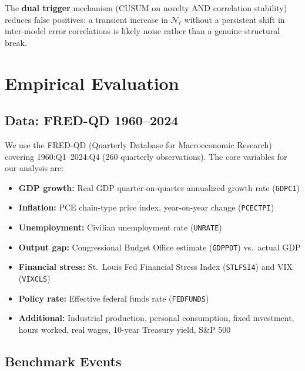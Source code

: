 \documentclass[12pt,a4paper]{article}
\begin{document}
The \textbf{dual trigger} mechanism (CUSUM on novelty AND correlation
stability) reduces false positives: a transient increase in
$\mathcal{N}_t$ without a persistent shift in inter-model error
correlations is likely noise rather than a genuine structural break.

\section{Empirical Evaluation}
\label{sec:empirical}

\subsection{Data: FRED-QD 1960--2024}

We use the FRED-QD (Quarterly Database for Macroeconomic Research)
\citep{mccracken2016fred} covering 1960:Q1--2024:Q4 (260 quarterly
observations).  The core variables for our analysis are:

\begin{itemize}[leftmargin=*]
    \item \textbf{GDP growth:} Real GDP quarter-on-quarter annualized
    growth rate (\texttt{GDPC1})
    \item \textbf{Inflation:} PCE chain-type price index, year-on-year
    change (\texttt{PCECTPI})
    \item \textbf{Unemployment:} Civilian unemployment rate
    (\texttt{UNRATE})
    \item \textbf{Output gap:} Congressional Budget Office estimate
    (\texttt{GDPPOT}) vs.\ actual GDP
    \item \textbf{Financial stress:} St.\ Louis Fed Financial Stress
    Index (\texttt{STLFSI4}) and VIX (\texttt{VIXCLS})
    \item \textbf{Policy rate:} Effective federal funds rate
    (\texttt{FEDFUNDS})
    \item \textbf{Additional:} Industrial production, personal
    consumption, fixed investment, hours worked, real wages,
    10-year Treasury yield, S\&P 500
\end{itemize}

\subsection{Benchmark Events}
\end{document}
